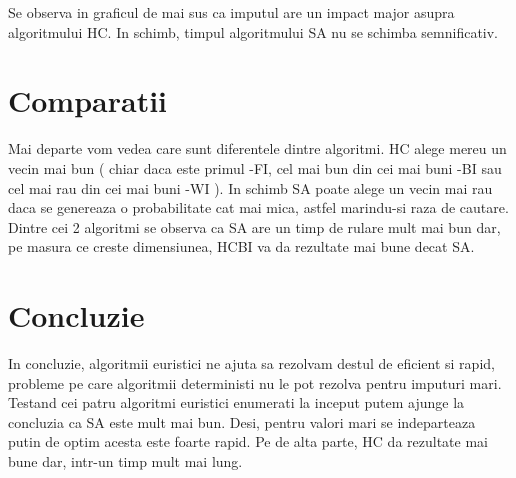 \documentclass[12pt]{article}
\begin{document}


Se observa in graficul de mai sus ca imputul are un impact major asupra algoritmului HC. In schimb, timpul algoritmului SA nu se schimba semnificativ.

\section{Comparatii}
Mai departe vom vedea care sunt diferentele dintre algoritmi. HC alege mereu un vecin mai bun ( chiar daca este primul -FI, cel mai bun din cei mai buni -BI sau cel mai rau din cei mai buni -WI ). In schimb SA poate alege un vecin mai rau daca se genereaza o probabilitate cat mai mica, astfel marindu-si raza de cautare. Dintre cei 2 algoritmi se observa ca SA are un timp de rulare mult mai bun dar, pe masura ce creste dimensiunea, HCBI va da rezultate mai bune decat SA.


\section{Concluzie}
In concluzie, algoritmii euristici ne ajuta sa rezolvam destul de eficient si rapid, probleme pe care algoritmii deterministi nu le pot rezolva pentru imputuri mari. Testand cei patru algoritmi euristici enumerati la inceput putem ajunge la concluzia ca SA este mult mai bun. Desi, pentru valori mari se indeparteaza putin de optim acesta este foarte rapid. Pe de alta parte, HC da rezultate mai bune dar, intr-un timp mult mai lung.
\end{document}
